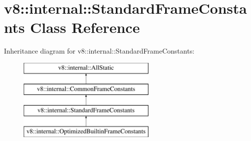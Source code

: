 \hypertarget{classv8_1_1internal_1_1StandardFrameConstants}{}\section{v8\+:\+:internal\+:\+:Standard\+Frame\+Constants Class Reference}
\label{classv8_1_1internal_1_1StandardFrameConstants}
Inheritance diagram for v8\+:\+:internal\+:\+:Standard\+Frame\+Constants\+:\begin{figure}[H]
\begin{center}
\leavevmode
\includegraphics[height=4.000000cm]{classv8_1_1internal_1_1StandardFrameConstants}
\end{center}
\end{figure}
